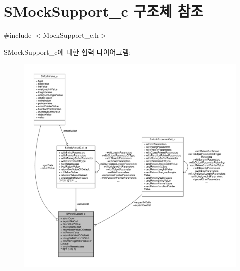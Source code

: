 \hypertarget{struct_s_mock_support__c}{}\section{S\+Mock\+Support\+\_\+c 구조체 참조}
\label{struct_s_mock_support__c}


{\ttfamily \#include $<$Mock\+Support\+\_\+c.\+h$>$}



S\+Mock\+Support\+\_\+c에 대한 협력 다이어그램\+:
\nopagebreak
\begin{figure}[H]
\begin{center}
\leavevmode
\includegraphics[width=350pt]{struct_s_mock_support__c__coll__graph}
\end{center}
\end{figure}
